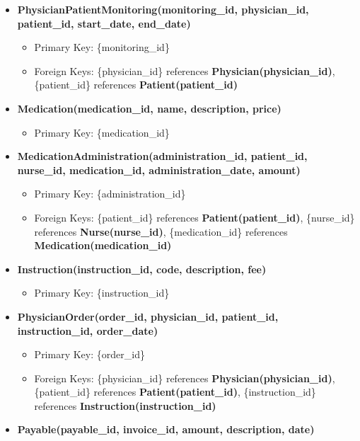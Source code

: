 \documentclass{article}
\begin{document}
\begin{itemize}
    \item \textbf{PhysicianPatientMonitoring(monitoring\_id, physician\_id, patient\_id, start\_date, end\_date)}
        \begin{itemize}
            \item Primary Key: \{monitoring\_id\}
            \item Foreign Keys: \{physician\_id\} references \textbf{Physician(physician\_id)}, \{patient\_id\} references \textbf{Patient(patient\_id)}
        \end{itemize}
    \item \textbf{Medication(medication\_id, name, description, price)}
        \begin{itemize}
            \item Primary Key: \{medication\_id\}
        \end{itemize}
    \item \textbf{MedicationAdministration(administration\_id, patient\_id, nurse\_id, medication\_id, administration\_date, amount)}
        \begin{itemize}
            \item Primary Key: \{administration\_id\}
            \item Foreign Keys: \{patient\_id\} references \textbf{Patient(patient\_id)}, \{nurse\_id\} references \textbf{Nurse(nurse\_id)}, \{medication\_id\} references \textbf{Medication(medication\_id)}
        \end{itemize}
    \item \textbf{Instruction(instruction\_id, code, description, fee)}
        \begin{itemize}
            \item Primary Key: \{instruction\_id\}
        \end{itemize}
    \item \textbf{PhysicianOrder(order\_id, physician\_id, patient\_id, instruction\_id, order\_date)}
        \begin{itemize}
            \item Primary Key: \{order\_id\}
            \item Foreign Keys: \{physician\_id\} references \textbf{Physician(physician\_id)}, \{patient\_id\} references \textbf{Patient(patient\_id)}, \{instruction\_id\} references \textbf{Instruction(instruction\_id)}
        \end{itemize}
    \item \textbf{Payable(payable\_id, invoice\_id, amount, description, date)}
        \begin{itemize}

\end{itemize}
\end{itemize}
\end{document}

